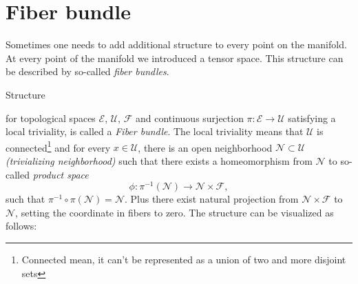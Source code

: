 \section{Fiber bundle}
\label{sec:bundleDef}
Sometimes one needs to add additional structure to every point on the manifold. At every point of the manifold we introduced a tensor space. This structure can be described by so-called \emph{fiber bundles}.
\begin{definition}
    \label{def:fiberBundle}
    Structure 
\begin{center}
\end{center}
    for topological spaces $\mathcal{E}$, $\mathcal{U}$, $\mathcal F$ and continuous surjection $\pi: \mathcal{E}\rightarrow \mathcal{U}$ satisfying a local triviality, is called a \emph{Fiber bundle}. The local triviality means that $\mathcal{U}$ is connected\footnote{Connected mean, it can't be represented as a union of two and more disjoint sets} and for every $x\in \mathcal{U}$, there is an open neighborhood $\mathcal{N}\subset \mathcal{U}$ \emph{(trivializing neighborhood)} such that there exists a homeomorphism from $\mathcal{N}$ to so-called \emph{product space}
    $$\phi: \pi^{-1}(\mathcal{N})\rightarrow \mathcal{N}\times \mathcal{F},$$
    such that $\pi^{-1}\circ \pi(\mathcal{N})=\mathcal{N}$. Plus there exist natural projection from $\mathcal{N}\times \mathcal{F}$ to $\mathcal N$, setting the coordinate in fibers to zero. The structure can be visualized as follows: 

    \begin{figure}[H]
        \centering
    \end{figure}

\end{definition}
